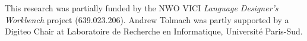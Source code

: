 \acks
This research was partially funded by the NWO VICI
\emph{Language Designer's Workbench} project (639.023.206). 
Andrew Tolmach was partly supported by a Digiteo Chair at 
Laboratoire de Recherche en Informatique, Universit\'e Paris-Sud.
